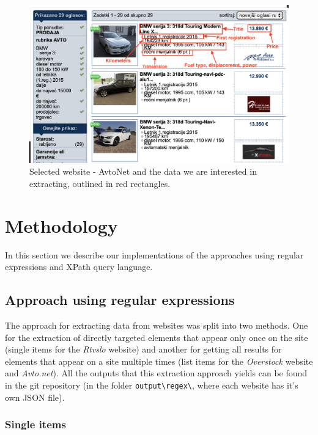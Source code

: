 \documentclass[9pt]{IEEEtran}
\begin{document}
\begin{figure}[h]
    \centering
    \includegraphics[width=1\columnwidth]{beemer.png}
    \caption{Selected website - AvtoNet and the data we are interested in extracting, outlined in red rectangles.}
    \label{fig:avtonet}
\end{figure}




\section{Methodology}
\label{section:methodology}

In this section we describe our implementations of the approaches using regular expressions and XPath query language.

\subsection{Approach using regular expressions}
\label{section:regex}

The approach for extracting data from websites was split into two methods. One for the extraction of directly targeted elements that appear only once on the site (single items for the \textit{Rtvslo} website) and another for getting all results for elements that appear on a site multiple times (list items for the \textit{Overstock} website and \textit{Avto.net}). All the outputs that this extraction approach yields can be found in the git repository (in the folder \verb/output\regex\/, where each website has it's own JSON file).

\subsubsection{Single items}
\end{document}
